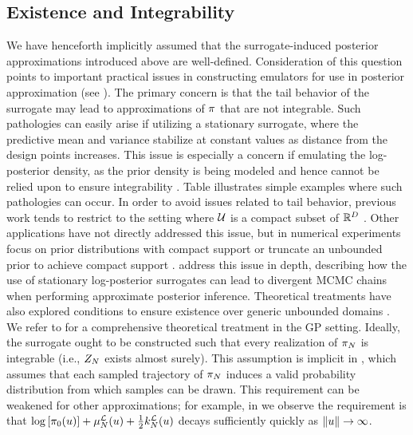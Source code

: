 \documentclass[12pt]{article}
\begin{document}
\subsection{Existence and Integrability} \label{sec:existence}
We have henceforth implicitly assumed that the surrogate-induced posterior approximations 
introduced above are well-defined. Consideration of this question points to important 
practical issues in constructing emulators for use in posterior approximation (see
). The primary concern
is that the tail behavior of the surrogate may lead to approximations of $\postDens$ that 
are not integrable. Such pathologies can easily arise if utilizing a stationary surrogate, where 
the predictive mean and variance stabilize at constant values as distance from the design points 
increases. This issue is especially a concern if emulating the log-posterior density, as the prior 
density is being modeled and hence cannot be relied upon to ensure integrability \citep{emPostDens}.
Table \todo illustrates simple examples where such pathologies can occur.
In order to avoid issues related to
tail behavior, previous work tends to restrict to the setting where $\parSpace$
is a compact subset of $\R^{\dimPar}$ \citep{StuartTeck1, VehtariParallelGP}.
Other applications have not directly addressed this issue, but in numerical experiments focus on 
prior distributions with compact support \citet{trainDynamics,FATES_CES} or truncate an unbounded
prior to achieve compact support \citep{gp_surrogates_random_exploration,FerEmulation}. 
\citet{emPostDens} address this issue in depth, describing how the use of stationary log-posterior
surrogates can lead to divergent MCMC chains when performing approximate posterior inference.
Theoretical treatments have also explored conditions to ensure existence over generic unbounded
domains \citep{random_fwd_models,garegnani2021NoisyMCMC}. We refer to 
\citep{StuartTeck1,StuartTeck2} for a comprehensive theoretical treatment in the GP setting.
Ideally, the surrogate ought to be constructed such that every realization of $\postEm[\Ndesign]$
is integrable (i.e., $\normCstEm$ exists almost surely). This assumption is implicit in , 
which assumes that each sampled trajectory of $\postEm[\Ndesign]$ induces a valid probability 
distribution from which samples can be drawn. This requirement can be weakened for other 
approximations; for example, in  we observe the requirement is that
$\log\left[\priorDens(\Par)\right] + \emMean[\Ndesign]{\llik}(\Par) + \frac{1}{2}\emKer[\Ndesign]{\llik}(\Par)$
decays sufficiently quickly as $\norm{\Par} \to \infty$. 
\end{document}

